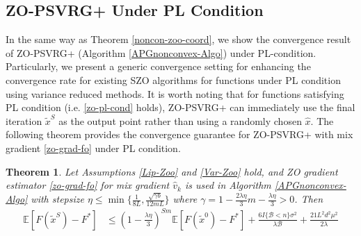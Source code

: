 \documentclass{article}
\newcommand*{\E}{\mathbb{E}}
\newtheorem{theorem}{Theorem}[section]
\theoremstyle{definition}
\theoremstyle{remark}
\begin{document}
\subsection{ZO-PSVRG+ Under PL Condition}
In the same way as Theorem \ref{noncon-zoo-coord}, we show the convergence result of ZO-PSVRG+ (Algorithm \ref{APGnonconvex-Algo}) under PL-condition. Particularly, we present a generic convergence setting for enhancing the convergence rate for  existing SZO algorithms for functions under PL condition using variance reduced methods. It is worth noting that for functions satisfying PL condition (i.e. \eqref{zo-pl-cond} holds), ZO-PSVRG+ can immediately use the final iteration $\tilde{x}^S$
as the output point rather than using a randomly chosen
$\hat{x}$. 
The following theorem provides the convergence guarantee for ZO-PSVRG+ with mix gradient \eqref{zo-grad-fo} under PL condition.
\begin{theorem}\label{PL-Zoo}
Let Assumptions \ref{Lip-Zoo} and \ref{Var-Zoo} hold, and  ZO gradient estimator \eqref{zo-grad-fo} for mix gradient $\hat{v}_k$ is  used  in  Algorithm \ref{APGnonconvex-Algo} with stepsize $\eta \leq \min\{\frac{1}{8L}, \frac{\sqrt{\gamma b}}{12 m L }\}$ where $\gamma = 1-\frac{2\lambda\eta}{3} m-\frac{\lambda\eta}{3} > 0$. Then 
\begin{equation}\label{PL-eq-error}
\begin{split}
\E[F(\tilde{x}^S) - {F}^*] & \leq   \left(1-\frac{\lambda\eta}{3}\right)^{Sm} \E[F(\tilde{x}^0) - {F}^*] + \frac{6I\{\mathcal{B} < n\} \sigma ^2}{\lambda \mathcal{B}}+\frac{21 L^2 d^2 \mu^2}{2\lambda}
\end{split}
\end{equation}
\end{theorem}
\end{document}

